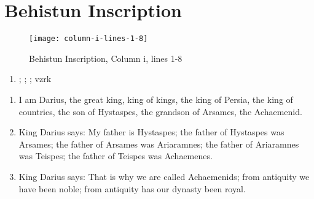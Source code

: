 \section{Behistun Inscription}

\begin{figure}[H]
    \texttt{[image: column-i-lines-1-8]}
    \caption{Behistun Inscription, Column i, lines 1-8\cite{BehistunT01}}
\end{figure}

\begin{enumerate}
    \item {\oldpersian ;} {\oldpersian ;}   {\oldpersian ;} {\oldpersian vzrk}
\end{enumerate}

\begin{enumerate}
    \item I am Darius, the great king, king of kings, the king of Persia, the king of countries, the son of Hystaspes,
         the grandson of Arsames, the Achaemenid.
    \item King Darius says: My father is Hystaspes; the father of Hystaspes was Arsames; the father of Arsames was
          Ariaramnes; the father of Ariaramnes was Teispes; the father of Teispes was Achaemenes.
    \item King Darius says: That is why we are called Achaemenids; from antiquity we have been noble; from antiquity
          has our dynasty been royal.
\end{enumerate}
